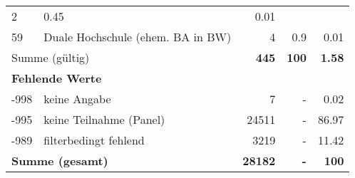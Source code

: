 \begin{longtable}{lXrrr}
       \num{2} &
       \num[round-mode=places,round-precision=2]{0,45} &
         \num[round-mode=places,round-precision=2]{0,01} \\

     59 &
     \multicolumn{1}{X}{ Duale Hochschule (ehem. BA in BW)   } &


       \num{4} &
       \num[round-mode=places,round-precision=2]{0,9} &
         \num[round-mode=places,round-precision=2]{0,01} \\
     \midrule
     \multicolumn{2}{l}{Summe (gültig)} &
       \textbf{\num{445}} &
     \textbf{100} &
       \textbf{\num[round-mode=places,round-precision=2]{1,58}} \\
     \multicolumn{5}{l}{\textbf{Fehlende Werte}}\\
       -998 &
       keine Angabe &
         \num{7} &
        - &
         \num[round-mode=places,round-precision=2]{0,02} \\
       -995 &
       keine Teilnahme (Panel) &
         \num{24511} &
        - &
         \num[round-mode=places,round-precision=2]{86,97} \\
       -989 &
       filterbedingt fehlend &
         \num{3219} &
        - &
         \num[round-mode=places,round-precision=2]{11,42} \\
     \midrule
     \multicolumn{2}{l}{\textbf{Summe (gesamt)}} &
          \textbf{\num{28182}} &
        \textbf{-} &
        \textbf{100} \\
     \bottomrule
     \end{longtable}
     
